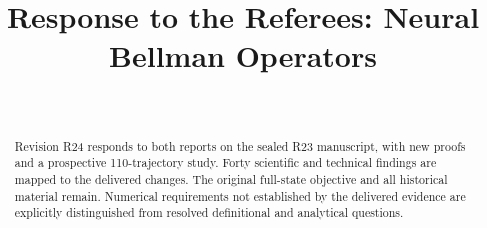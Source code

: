 \documentclass[ecta]{econsocart}
\theoremstyle{remark}
\begin{document}
\begin{frontmatter}
\title{Response to the Referees: Neural Bellman Operators}
\begin{aug}
\author[id=au1,addressref={add1}]{~}
\address[id=add1]{}
\end{aug}
\begin{abstract}Revision R24 responds to both reports on the sealed R23 manuscript, with new proofs and a prospective 110-trajectory study. Forty scientific and technical findings are mapped to the delivered changes. The original full-state objective and all historical material remain. Numerical requirements not established by the delivered evidence are explicitly distinguished from resolved definitional and analytical questions.\end{abstract}
\begin{keyword}
\end{keyword}
\end{frontmatter}

\end{document}
